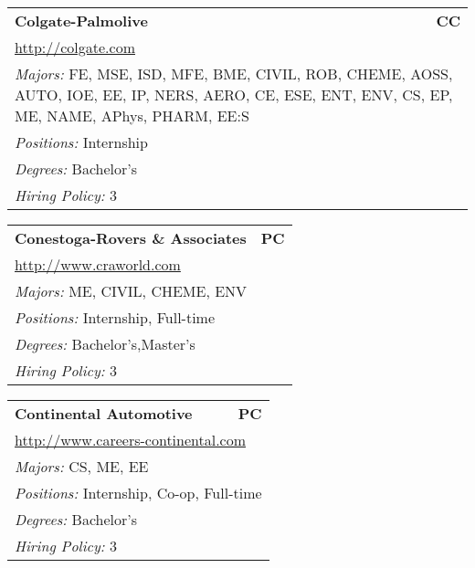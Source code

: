 \documentclass[twoside]{article}
\begin{document}
\begin{center}
\begin{multicols}{3}
\begin{FlushLeft}
\begin{minipage}{.9\columnwidth}\begin{tabularx}{.95\columnwidth}{Xr}
                 {\Large\bf Colgate-Palmolive} & {\Large\bf CC}\\
    \multicolumn{2}{p{.95\columnwidth}}{\url{http://colgate.com}}\\
    \multicolumn{2}{p{.95\columnwidth}}{\emph{Majors:} FE, MSE, ISD, MFE, BME, CIVIL, ROB, CHEME, AOSS, AUTO, IOE, EE, IP, NERS, AERO, CE, ESE, ENT, ENV, CS, EP, ME, NAME, APhys, PHARM, EE:S}\\
    \multicolumn{2}{p{.95\columnwidth}}{\emph{Positions:} Internship}\\
    \multicolumn{2}{p{.95\columnwidth}}{\emph{Degrees:} Bachelor's}\\
    \multicolumn{2}{p{.95\columnwidth}}{\emph{Hiring Policy:} 3}\\
    \end{tabularx}
    
\end{minipage}
 
\begin{minipage}{.9\columnwidth}\begin{tabularx}{.95\columnwidth}{Xr}
                 {\Large\bf Conestoga-Rovers \& Associates} & {\Large\bf PC}\\
    \multicolumn{2}{p{.95\columnwidth}}{\url{http://www.craworld.com}}\\
    \multicolumn{2}{p{.95\columnwidth}}{\emph{Majors:} ME, CIVIL, CHEME, ENV}\\
    \multicolumn{2}{p{.95\columnwidth}}{\emph{Positions:} Internship, Full-time}\\
    \multicolumn{2}{p{.95\columnwidth}}{\emph{Degrees:} Bachelor's,Master's}\\
    \multicolumn{2}{p{.95\columnwidth}}{\emph{Hiring Policy:} 3}\\
    \end{tabularx}
    
\end{minipage}
 
\begin{minipage}{.9\columnwidth}\begin{tabularx}{.95\columnwidth}{Xr}
                 {\Large\bf Continental Automotive} & {\Large\bf PC}\\
    \multicolumn{2}{p{.95\columnwidth}}{\url{http://www.careers-continental.com}}\\
    \multicolumn{2}{p{.95\columnwidth}}{\emph{Majors:} CS, ME, EE}\\
    \multicolumn{2}{p{.95\columnwidth}}{\emph{Positions:} Internship, Co-op, Full-time}\\
    \multicolumn{2}{p{.95\columnwidth}}{\emph{Degrees:} Bachelor's}\\
    \multicolumn{2}{p{.95\columnwidth}}{\emph{Hiring Policy:} 3}\\
    \end{tabularx}
    

\end{minipage}
\end{FlushLeft}
\end{multicols}
\end{center}
\end{document}
